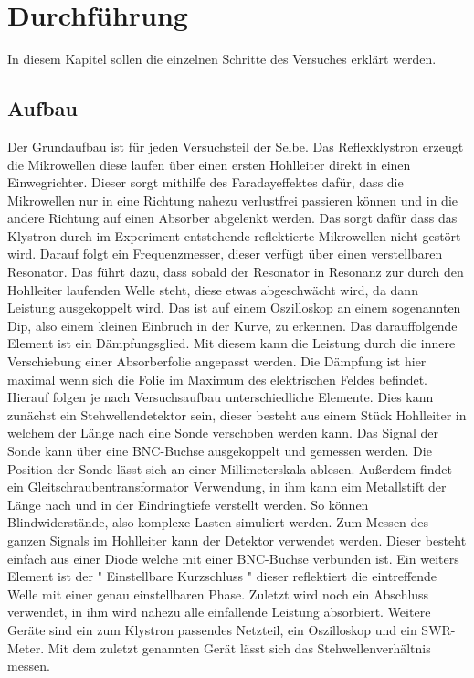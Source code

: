 \section{Durchführung}
\label{sec:Durchfuehrung}
In diesem Kapitel sollen die einzelnen Schritte des Versuches erklärt werden.

\subsection{Aufbau}
\label{sec:dfaufbau}
Der Grundaufbau ist für jeden Versuchsteil der Selbe. Das Reflexklystron erzeugt die Mikrowellen
diese laufen über einen ersten Hohlleiter direkt in einen Einwegrichter. Dieser sorgt mithilfe des Faradayeffektes
dafür, dass die Mikrowellen nur in eine Richtung nahezu verlustfrei passieren können und in die andere Richtung 
auf einen Absorber abgelenkt werden. Das sorgt dafür dass das Klystron durch im Experiment entstehende 
reflektierte Mikrowellen nicht gestört wird. Darauf folgt ein Frequenzmesser, dieser verfügt über einen 
verstellbaren Resonator. Das führt dazu, dass sobald der Resonator in Resonanz zur durch den Hohlleiter laufenden Welle
steht, diese etwas abgeschwächt wird, da dann Leistung ausgekoppelt wird. Das ist auf einem Oszilloskop an einem
sogenannten Dip, also einem kleinen Einbruch in der Kurve, zu erkennen. Das darauffolgende Element ist
ein Dämpfungsglied. Mit diesem kann die Leistung durch die innere Verschiebung einer Absorberfolie
angepasst werden. Die Dämpfung ist hier maximal wenn sich die Folie im Maximum des elektrischen Feldes 
befindet. Hierauf folgen je nach Versuchsaufbau unterschiedliche Elemente. Dies kann zunächst ein Stehwellendetektor
sein, dieser besteht aus einem Stück Hohlleiter in welchem der Länge nach eine Sonde verschoben werden kann. 
Das Signal der Sonde kann über eine BNC-Buchse ausgekoppelt und gemessen werden. Die Position der Sonde
lässt sich an einer Millimeterskala ablesen. Außerdem findet ein Gleitschraubentransformator Verwendung,
in ihm kann eim Metallstift der Länge nach und in der Eindringtiefe verstellt werden. So können
Blindwiderstände, also komplexe Lasten simuliert werden. Zum Messen des ganzen Signals im Hohlleiter
kann der Detektor verwendet werden. Dieser besteht einfach aus einer Diode welche mit einer BNC-Buchse
verbunden ist. Ein weiters Element ist der " Einstellbare Kurzschluss " dieser 
reflektiert die eintreffende Welle mit einer genau einstellbaren Phase. Zuletzt wird noch ein Abschluss
verwendet, in ihm wird nahezu alle einfallende Leistung absorbiert. Weitere Geräte sind ein zum Klystron passendes
Netzteil, ein Oszilloskop und ein SWR-Meter. Mit dem zuletzt genannten Gerät lässt sich das Stehwellenverhältnis
messen.

